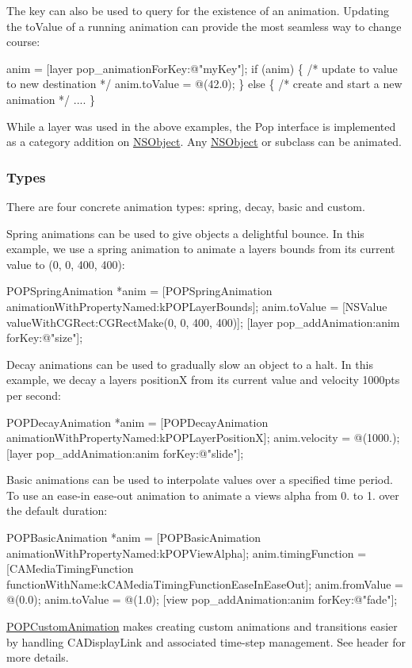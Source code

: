 The key can also be used to query for the existence of an animation. Updating the to\+Value of a running animation can provide the most seamless way to change course\+:


\begin{DoxyCode}
anim = [layer pop\_animationForKey:@"myKey"];
if (anim) \{
  /* update to value to new destination */
  anim.toValue = @(42.0);
\} else \{
  /* create and start a new animation */
  ....
\}
\end{DoxyCode}


While a layer was used in the above examples, the Pop interface is implemented as a category addition on \mbox{\hyperlink{class_n_s_object-p}{N\+S\+Object}}. Any \mbox{\hyperlink{class_n_s_object-p}{N\+S\+Object}} or subclass can be animated.

\subsubsection*{Types}

There are four concrete animation types\+: spring, decay, basic and custom.

Spring animations can be used to give objects a delightful bounce. In this example, we use a spring animation to animate a layer\textquotesingle{}s bounds from its current value to (0, 0, 400, 400)\+:


\begin{DoxyCode}
POPSpringAnimation *anim = [POPSpringAnimation animationWithPropertyNamed:kPOPLayerBounds];
anim.toValue = [NSValue valueWithCGRect:CGRectMake(0, 0, 400, 400)];
[layer pop\_addAnimation:anim forKey:@"size"];
\end{DoxyCode}
 Decay animations can be used to gradually slow an object to a halt. In this example, we decay a layer\textquotesingle{}s positionX from it\textquotesingle{}s current value and velocity 1000pts per second\+:


\begin{DoxyCode}
POPDecayAnimation *anim = [POPDecayAnimation animationWithPropertyNamed:kPOPLayerPositionX];
anim.velocity = @(1000.);
[layer pop\_addAnimation:anim forKey:@"slide"];
\end{DoxyCode}


Basic animations can be used to interpolate values over a specified time period. To use an ease-\/in ease-\/out animation to animate a view\textquotesingle{}s alpha from 0. to 1. over the default duration\+: 
\begin{DoxyCode}
POPBasicAnimation *anim = [POPBasicAnimation animationWithPropertyNamed:kPOPViewAlpha];
anim.timingFunction = [CAMediaTimingFunction functionWithName:kCAMediaTimingFunctionEaseInEaseOut];
anim.fromValue = @(0.0);
anim.toValue = @(1.0);
[view pop\_addAnimation:anim forKey:@"fade"];
\end{DoxyCode}
 {\ttfamily \mbox{\hyperlink{interface_p_o_p_custom_animation}{P\+O\+P\+Custom\+Animation}}} makes creating custom animations and transitions easier by handling C\+A\+Display\+Link and associated time-\/step management. See header for more details.

